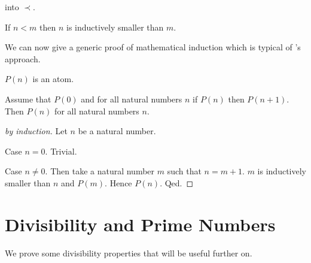 \documentclass{article}
\begin{document}
into $\prec$.
%
\begin{forthel}
\begin{axiom}
If $n < m$ then $n$ is inductively smaller than $m$.
\end{axiom}
\end{forthel}
We can now give a generic proof of mathematical induction which
is typical of \Naproche's approach.
\begin{forthel}
\begin{signature}
$P(n)$ is an atom.
\end{signature}

\begin{theorem}
Assume that $P(0)$ and for all natural numbers
$n$ if $P(n)$ then  $P(n+1)$.
Then $P(n)$ for all natural numbers $n$.
\end{theorem}
\begin{proof}[by induction]
Let $n$ be a natural number.

Case $n = 0$. Trivial.

Case $n \neq 0$. Then take a natural number $m$ such that
$n = m + 1$. $m$ is inductively smaller than $n$ and $P(m)$. 
Hence $P(n)$.
Qed.
\end{proof}
\end{forthel}


\section{Divisibility and Prime Numbers}


We prove some divisibility properties that will be useful
further on.
\end{document}
